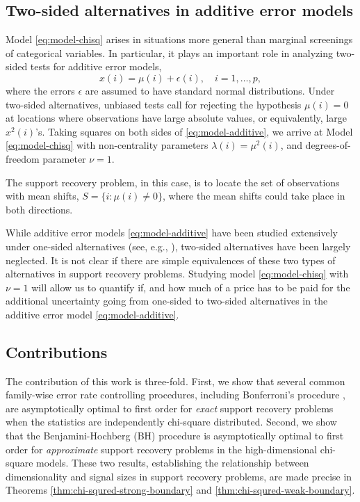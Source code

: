 \subsection{Two-sided alternatives in additive error models}
\label{subsec:motivation-additive}

Model \eqref{eq:model-chisq} arises in situations more general than marginal screenings of categorical variables.
In particular, it plays an important role in analyzing two-sided tests for additive error models,
\begin{equation} \label{eq:model-additive}
    x(i) = \mu(i) + \epsilon(i), \quad i=1,\ldots,p,
\end{equation}
where the errors $\epsilon$ are assumed to have standard normal distributions.
Under two-sided alternatives, unbiased tests call for rejecting the hypothesis $\mu(i)=0$ at locations where observations have large absolute values, or equivalently, large $x^2(i)$'s.
Taking squares on both sides of \eqref{eq:model-additive}, we arrive at Model \eqref{eq:model-chisq} with non-centrality parameters $\lambda(i) = \mu^2(i)$, and degrees-of-freedom parameter $\nu =1$.

The support recovery problem, in this case, is to locate the set of observations with mean shifts, $S=\{i:\mu(i)\neq 0\}$, where the mean shifts could take place in both directions.

While additive error models \eqref{eq:model-additive} have been studied extensively under one-sided alternatives (see, e.g., \cite{arias2017distribution, butucea2018variable, gao2018fundamental}), two-sided alternatives have been largely neglected.
It is not clear if there are simple equivalences of these two types of alternatives in support recovery problems.
Studying model \eqref{eq:model-chisq} with $\nu =1 $ will allow us to quantify if, and how much of a price has to be paid for the additional uncertainty going from one-sided to two-sided alternatives in the additive error model \eqref{eq:model-additive}.

\subsection{Contributions}

The contribution of this work is three-fold.
First, we show that several common family-wise error rate controlling procedures, including Bonferroni's procedure \cite{dunn1961multiple}, are asymptotically optimal to first order for \emph{exact} support recovery problems when the statistics are independently chi-square distributed.
Second, we show that the Benjamini-Hochberg (BH) procedure \cite{benjamini1995controlling} is asymptotically optimal to first order for \emph{approximate} support recovery problems in the high-dimensional chi-square models.
These two results, establishing the relationship between dimensionality and signal sizes in support recovery problems, are made precise in Theorems \ref{thm:chi-squred-strong-boundary} and \ref{thm:chi-squred-weak-boundary}.


